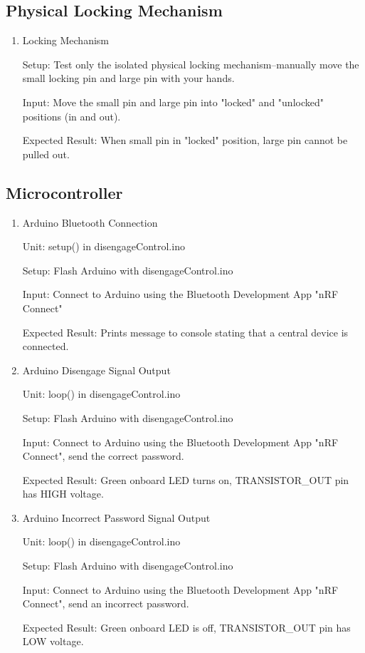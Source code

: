 \documentclass[12pt, titlepage]{article}
\begin{document}
\subsection{Physical Locking Mechanism}
\begin{enumerate}
    \item{Locking Mechanism} \label{lock-mech}
    
    Setup: Test only the isolated physical locking mechanism--manually move the small locking pin and large pin with your hands.
    
    Input: Move the small pin and large pin into "locked" and "unlocked" positions (in and out). 
    
    Expected Result: When small pin in "locked" position, large pin cannot be pulled out. 

\end{enumerate}

\subsection{Microcontroller}
\begin{enumerate}
    \item{Arduino Bluetooth Connection} \label{arduinoBluetoothConnection} 

    Unit: setup() in disengageControl.ino
    
    Setup: Flash Arduino with disengageControl.ino

    Input: Connect to Arduino using the Bluetooth Development App "nRF Connect"

    Expected Result: Prints message to console stating that a central device is connected.

    \item{Arduino Disengage Signal Output} \label{arduinoDisengageSignalOutput}

    Unit: loop() in disengageControl.ino
    
    Setup: Flash Arduino with disengageControl.ino

    Input: Connect to Arduino using the Bluetooth Development App "nRF Connect", send the correct password.

    Expected Result: Green onboard LED turns on, TRANSISTOR\_OUT pin has HIGH voltage. 

    \item{Arduino Incorrect Password Signal Output} \label{arduinoIncorrect}

    Unit: loop() in disengageControl.ino
    
    Setup: Flash Arduino with disengageControl.ino

    Input: Connect to Arduino using the Bluetooth Development App "nRF Connect", send an incorrect password.

    Expected Result: Green onboard LED is off, TRANSISTOR\_OUT pin has LOW voltage. 
\end{enumerate}
\end{document}
